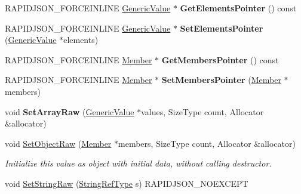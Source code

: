 \begin{DoxyCompactItemize}
\item 
R\+A\+P\+I\+D\+J\+S\+O\+N\+\_\+\+F\+O\+R\+C\+E\+I\+N\+L\+I\+NE \hyperlink{class_generic_value}{Generic\+Value} $\ast$ {\bfseries Get\+Elements\+Pointer} () const \hypertarget{class_generic_value_afcbbb25acbc79b7f44a85e59e72612eb}{}\label{class_generic_value_afcbbb25acbc79b7f44a85e59e72612eb}

\item 
R\+A\+P\+I\+D\+J\+S\+O\+N\+\_\+\+F\+O\+R\+C\+E\+I\+N\+L\+I\+NE \hyperlink{class_generic_value}{Generic\+Value} $\ast$ {\bfseries Set\+Elements\+Pointer} (\hyperlink{class_generic_value}{Generic\+Value} $\ast$elements)\hypertarget{class_generic_value_ad8ac8518160251babea5065f9eea8982}{}\label{class_generic_value_ad8ac8518160251babea5065f9eea8982}

\item 
R\+A\+P\+I\+D\+J\+S\+O\+N\+\_\+\+F\+O\+R\+C\+E\+I\+N\+L\+I\+NE \hyperlink{class_generic_value_a7ccf27c44058b4c11c3efc6473afb886}{Member} $\ast$ {\bfseries Get\+Members\+Pointer} () const \hypertarget{class_generic_value_a7aa0da2eb76b9147799827367c3e98d1}{}\label{class_generic_value_a7aa0da2eb76b9147799827367c3e98d1}

\item 
R\+A\+P\+I\+D\+J\+S\+O\+N\+\_\+\+F\+O\+R\+C\+E\+I\+N\+L\+I\+NE \hyperlink{class_generic_value_a7ccf27c44058b4c11c3efc6473afb886}{Member} $\ast$ {\bfseries Set\+Members\+Pointer} (\hyperlink{class_generic_value_a7ccf27c44058b4c11c3efc6473afb886}{Member} $\ast$members)\hypertarget{class_generic_value_a0b488cb0120b154eadde27dc0e694019}{}\label{class_generic_value_a0b488cb0120b154eadde27dc0e694019}

\item 
void {\bfseries Set\+Array\+Raw} (\hyperlink{class_generic_value}{Generic\+Value} $\ast$values, Size\+Type count, Allocator \&allocator)\hypertarget{class_generic_value_a8f5f309065479de40a16cf28a340da65}{}\label{class_generic_value_a8f5f309065479de40a16cf28a340da65}

\item 
void \hyperlink{class_generic_value_a26c8ec7d68858df1038506df7fcff22d}{Set\+Object\+Raw} (\hyperlink{class_generic_value_a7ccf27c44058b4c11c3efc6473afb886}{Member} $\ast$members, Size\+Type count, Allocator \&allocator)\hypertarget{class_generic_value_a26c8ec7d68858df1038506df7fcff22d}{}\label{class_generic_value_a26c8ec7d68858df1038506df7fcff22d}

\begin{DoxyCompactList}\small\item\em Initialize this value as object with initial data, without calling destructor. \end{DoxyCompactList}\item 
void \hyperlink{class_generic_value_a1451603922dcdf34976f125dc60f70ee}{Set\+String\+Raw} (\hyperlink{class_generic_value_a32e0f30ee278072374c8168b14d3317f}{String\+Ref\+Type} s) R\+A\+P\+I\+D\+J\+S\+O\+N\+\_\+\+N\+O\+E\+X\+C\+E\+PT\hypertarget{class_generic_value_a1451603922dcdf34976f125dc60f70ee}{}\label{class_generic_value_a1451603922dcdf34976f125dc60f70ee}


\end{DoxyCompactItemize}
